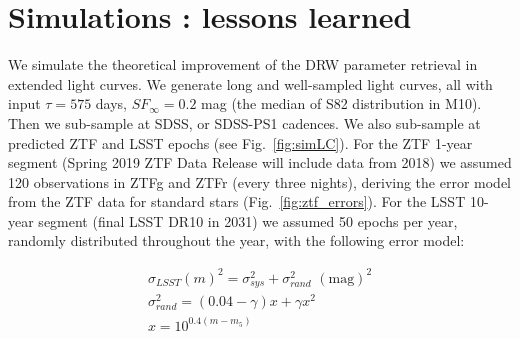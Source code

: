 \documentclass[twocolumn]{aastex62}
\begin{document}



%
%
%
%
%

\section{Simulations : lessons learned}\label{sec:simulation}

We simulate the theoretical improvement of the DRW parameter retrieval in extended light curves. We generate long and well-sampled light curves, all with input $\tau = 575 $ days, $SF_{\infty} = 0.2$ mag (the median of S82 distribution in M10). Then we sub-sample at SDSS, or SDSS-PS1 cadences. We also sub-sample at predicted ZTF and LSST epochs (see Fig.~\ref{fig:simLC}). For the ZTF 1-year segment (Spring 2019 ZTF Data Release will include data from 2018) we assumed 120 observations in ZTFg and ZTFr (every three nights), deriving the error model from the ZTF data for standard stars (Fig.~\ref{fig:ztf_errors}). For the LSST 10-year segment (final LSST DR10 in 2031) we assumed 50 epochs per year, randomly distributed throughout the year, with the following error model:

\begin{eqnarray}
\sigma_{LSST}(m)^{2} = \sigma_{sys}^{2} + \sigma_{rand}^{2} \,\, \mathrm{(mag)}^{2}\\
\sigma_{rand}^{2} = (0.04-\gamma)x + \gamma x^{2} \\
x = 10^{0.4(m-m_{5})}
\end{eqnarray}
\end{document}
